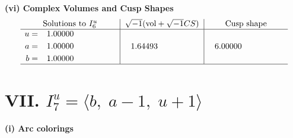 \documentclass[1p]{elsarticle_modified}
\theoremstyle{definition}
\newcommand{\I}{\sqrt{-1}}
\begin{document}
\newpage\flushleft \textbf{(vi) Complex Volumes and Cusp Shapes}
$$\begin{array}{c|c|c}  
\text{Solutions to }I^u_{6}& \I (\text{vol} + \sqrt{-1}CS) & \text{Cusp shape}\\
 \hline 
\begin{aligned}
u &= \phantom{-}1.00000\phantom{ +0.000000I} \\
a &= \phantom{-}1.00000\phantom{ +0.000000I} \\
b &= \phantom{-}1.00000\phantom{ +0.000000I}\end{aligned}
 & \phantom{-}1.64493\phantom{ +0.000000I} & \phantom{-}6.00000\phantom{ +0.000000I}\\
 \hline 
 \end{array}$$\newpage\newpage\renewcommand{\arraystretch}{1}
\centering \section*{VII. $I^u_{7}= \langle b,\;a-1,\;u+1 \rangle$}
\flushleft \textbf{(i) Arc colorings}\\
\end{document}
